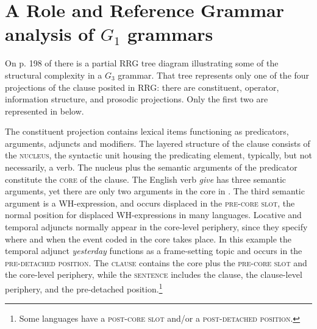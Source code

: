\documentclass[output=paper,colorlinks,citecolor=brown]{langscibook}
\begin{document}
\section{A Role and Reference Grammar analysis of $G_1$ grammars}\label{sec:vanvalin:3}

On p. 198 of  there is a partial RRG tree diagram illustrating some of the structural complexity in a $G_3$ grammar.  That tree represents only one of the four projections of the clause posited in RRG: there are constituent, operator, information structure, and prosodic projections. Only the first two are represented in  below.  

The constituent projection contains lexical items functioning as predicators, arguments, adjuncts and modifiers.  The layered structure of the clause consists of the \textsc{nucleus}, the syntactic unit housing the predicating element, typically, but not necessarily, a verb.  The nucleus plus the semantic arguments of the predicator constitute the \textsc{core} of the clause.  The English verb \textit{give} has three semantic arguments, yet there are only two arguments in the core in . The third semantic argument is a WH-expression, and occurs displaced in the \textsc{pre-core slot}, the normal position for displaced WH-expressions in many languages. Locative and temporal adjuncts normally appear in the core-level periphery, since they specify where and when the event coded in the core takes place.  In this example the temporal adjunct \textit{yesterday} functions as a frame-setting topic and occurs in the \textsc{pre-detached position}.  The \textsc{clause} contains the core plus the \textsc{pre-core slot} and the core-level periphery, while the \textsc{sentence} includes the clause, the clause-level periphery, and the pre-detached position.\footnote{Some languages have a  \textsc{post-core slot} and/or a \textsc{post-detached position}.}
\end{document}
